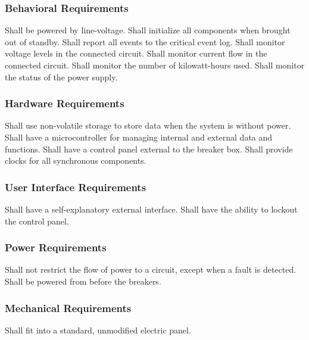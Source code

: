 \subsubsection{Behavioral Requirements}
\begin{outline}[enumerate]
\1 Shall be powered by line-voltage.
\1 Shall initialize all components when brought out of standby.
\1 Shall report all events to the critical event log.
\1 Shall monitor voltage levels in the connected circuit.
\1 Shall monitor current flow in the connected circuit.
\1 Shall monitor the number of kilowatt-hours used.
\1 Shall monitor the status of the power supply.
\end{outline}

\subsubsection{Hardware Requirements}
\begin{outline}[enumerate]
\1 Shall use non-volatile storage to store data when the system is without power. 
\1 Shall have a microcontroller for managing internal and external data and functions.
\1 Shall have a control panel external to the breaker box.
\1 Shall provide clocks for all synchronous components.
\end{outline}

\subsubsection{User Interface Requirements}
\begin{outline}[enumerate]
\1 Shall have a self-explanatory external interface.
\1 Shall have the ability to lockout the control panel. 
\end{outline}

\subsubsection{Power Requirements}
\begin{outline}[enumerate]
\1 Shall not restrict the flow of power to a circuit, except when a fault is detected.
\1 Shall be powered from before the breakers.
\end{outline}

\subsubsection{Mechanical Requirements}
\begin{outline}[enumerate]
\1 Shall fit into a standard, unmodified electric panel.
\end{outline}

